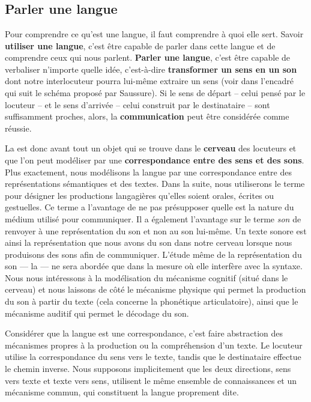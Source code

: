 \chapter{}\label{sec:1.1}

\section{Parler une langue}\label{sec:1.1.0}

Pour comprendre ce qu’est une langue, il faut comprendre à quoi elle sert. Savoir \textbf{utiliser une langue}, c’est être capable de parler dans cette langue et de comprendre ceux qui nous parlent. \textbf{Parler une langue}, c’est être capable de verbaliser n’importe quelle idée, c’est-à-dire \textbf{transformer un sens en un son} dont notre interlocuteur pourra lui-même extraire un sens (voir dans l’encadré qui suit le schéma proposé par Saussure). Si le sens de départ – celui pensé par le locuteur – et le sens d’arrivée – celui construit par le destinataire – sont suffisamment proches, alors, la \textbf{communication} peut être considérée comme réussie.

La  est donc avant tout un objet qui se trouve dans le \textbf{cerveau} des locuteurs et que l’on peut modéliser par une \textbf{correspondance entre des sens et des sons}. Plus exactement, nous modélisons la langue par une correspondance entre des représentations sémantiques et des textes. Dans la suite, nous utiliserons le terme  pour désigner les productions langagières qu’elles soient orales, écrites ou gestuelles. Ce terme a l’avantage de ne pas présupposer quelle est la nature du médium utilisé pour communiquer. Il a également l’avantage sur le terme \textit{son} de renvoyer à une représentation du son et non au son lui-même. Un texte sonore est ainsi la représentation que nous avons du son dans notre cerveau lorsque nous produisons des sons afin de communiquer. L’étude même de la représentation du son — la  — ne sera abordée que dans la mesure où elle interfère avec la syntaxe. Nous nous intéressons à la modélisation du mécanisme cognitif (situé dans le cerveau) et nous laissons de côté le mécanisme physique qui permet la production du son à partir du texte (cela concerne la phonétique articulatoire), ainsi que le mécanisme auditif qui permet le décodage du son.

Considérer que la langue est une correspondance, c’est faire abstraction des mécanismes propres à la production ou la compréhension d’un texte. Le locuteur utilise la correspondance du sens vers le texte, tandis que le destinataire effectue le chemin inverse. Nous supposons implicitement que les deux directions, sens vers texte et texte vers sens, utilisent le même ensemble de connaissances et un mécanisme commun, qui constituent la langue proprement dite.

